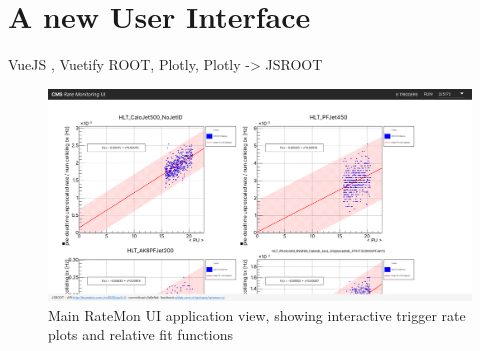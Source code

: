 \section{A new User Interface}

VueJS \cite{Vuejs-2020-10-04}, Vuetify \cite{VuetifyAMaterialDesignFrameworkforVuejs-2020-10-04} ROOT, Plotly, Plotly -> JSROOT \cite{JavaScriptROOT-2020-05-07}

\begin{figure}
    \centerline{
        \includegraphics[width=0.9\paperwidth]{figures/ratemon-ui0.png}}
    \caption{Main RateMon UI application view, showing interactive trigger rate plots and relative fit functions}
    \label{fig:ratemon_ui0}
\end{figure}